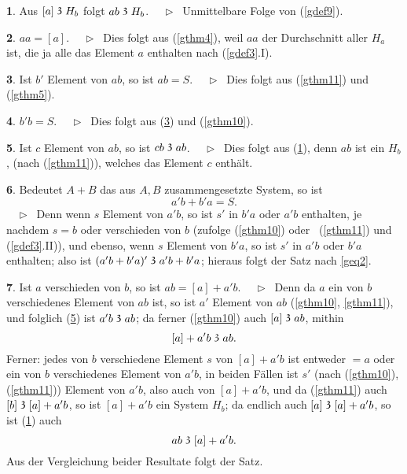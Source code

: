 \documentclass[leqno,hidelinks,a4paper]{article}
\theoremstyle{definition}
\newtheorem{satz}{\protect\satzname}
\newcommand{\satzname}{}
\renewcommand{\satzname}{\hspace{-4pt}.\ Satz}%
\renewcommand{\satzname}{\hspace{-4pt}.\ Theorem}%
\newcommand\Beweis{\medskip \newline $ \phantom{'.'} \rhd \ $}%
\newcommand\TeilVon{\mathrel{\raisebox{0.45ex}{$\mathfrak{3}$}}}
\begin{document}
\begin{paracol}{2}
\begin{satz}\label{gthm12}
Aus $[a] \TeilVon H_b$ folgt $ab \TeilVon H_b$.
\Beweis
Unmittelbare Folge von (\ref{gdef9}).
\end{satz}

\begin{satz}\label{gthm13}
$aa = [a]$.
\Beweis
Dies folgt aus (\ref{gthm4}), weil $aa$ der Durchschnitt aller $H_a$  ist, die
ja alle das Element $a$ enthalten nach (\ref{gdef3}.I).
\end{satz}

\begin{satz}\label{gthm14}
Ist $b'$ Element von $ab$, so ist $ab = S$.
\Beweis
Dies folgt aus (\ref{gthm11}) und (\ref{gthm5}).
\end{satz}

\begin{satz}\label{gthm15}
$b' b = S$.
\Beweis
Dies folgt aus (\ref{gthm14}) und (\ref{gthm10}).
\end{satz}

\begin{satz}\label{gthm16}
Ist $c$ Element von $ab$, so ist $cb \TeilVon ab$.
\Beweis
Dies folgt aus (\ref{gthm12}), denn $ab$ ist ein $H_b$,
(nach (\ref{gthm11})), welches das Element $c$ enthält.
\end{satz}

\begin{satz}\label{gthm17}
Bedeutet $A + B$ das aus $A, B$ zusammengesetzte System, so ist
\[
	a'b + b'a = S.
\]
\vspace*{-16pt}%
\Beweis
Denn wenn $s$ Element von $a'b$, so ist $s'$ in $b'a$ oder $a'b$
enthalten, je nachdem $s = b$ oder verschieden von $b$ (zufolge (\ref{gthm10})
oder ~(\ref{gthm11}) und (\ref{gdef3}.II)), und ebenso, wenn $s$ Element von
$b'a$, so ist $s'$ in $a'b$ oder $b'a$ enthalten; also ist
$(a'b + b'a)' \TeilVon a'b + b'a$; hieraus folgt der Satz nach \eqref{geq2}.
\end{satz}

\begin{satz}\label{gthm18}
Ist $a$ verschieden von $b$, so ist $ab = [a] + a'b$.
\Beweis
Denn da $a$ ein von $b$ verschiedenes Element von $ab$ ist, so ist $a'$ Element
von $ab$ (\ref{gthm10}, \ref{gthm11}), und folglich (\ref{gthm16}) ist
$a'b \TeilVon ab$; da ferner (\ref{gthm10}) auch $[a] \TeilVon ab$, mithin
\[
	[a] + a'b \TeilVon ab.
\]
Ferner: jedes von $b$ verschiedene Element $s$ von $[a] + a'b$ ist entweder
$= a$ oder ein von $b$ verschiedenes Element von $a'b$, in beiden Fällen ist
$s'$ (nach (\ref{gthm10}), (\ref{gthm11})) Element von $a'b$, also auch von
$[a]+ a'b$, und da (\ref{gthm11}) auch $[b] \TeilVon [a] + a'b$, so ist
$[a] + a'b$ ein System $H_b$; da endlich auch $[a] \TeilVon [a] + a'b$, so ist
(\ref{gthm12}) auch
\[
	ab \TeilVon [a] + a' b.
\]
Aus der Vergleichung beider Resultate folgt der Satz.
\end{satz}


\end{paracol}
\end{document}
